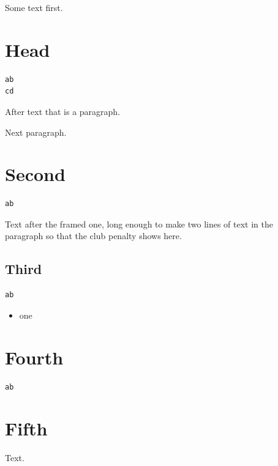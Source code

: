 \documentclass{article}
\begin{document}
Some text first.
\section{Head}
\begin{lstlisting}
ab
cd
\end{lstlisting}
After text that is a paragraph.

Next paragraph.
\section{Second}
\begin{lstlisting}[frame=single]
ab
\end{lstlisting}
Text after the framed one, long enough to make two lines of text in the paragraph so that the club penalty shows here.
\subsection{Third}
\begin{lstlisting}
ab
\end{lstlisting}
\begin{itemize}
\item one
\end{itemize}
\section{Fourth}
\begin{lstlisting}
ab
\end{lstlisting}

\section{Fifth}
Text.
\end{document}
